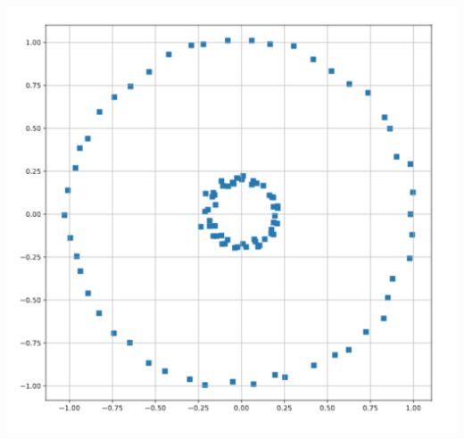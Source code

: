 \documentclass[12pt, a4paper, oneside]{article}
\begin{document}
\begin{center}
	\includegraphics[scale=0.17]{circles.png}
\end{center}
\end{document}
